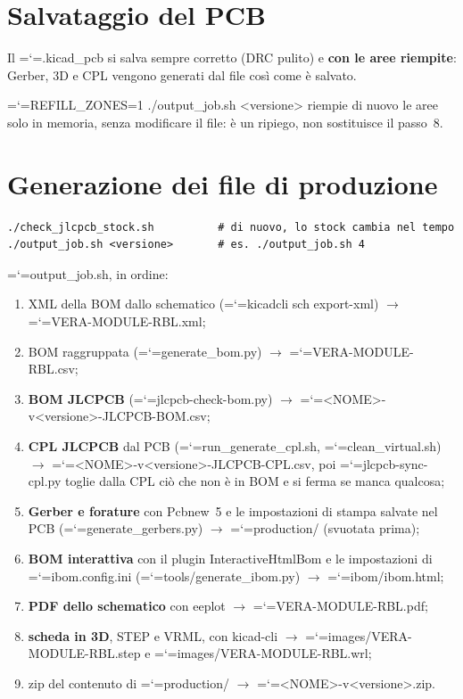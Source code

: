 \documentclass[11pt,a4paper]{article}
\makeatletter
\newcommand{\file}[1]{{\ttfamily\hyphenchar\font=`\-\relax\language=\l@nohyphenation #1}}
\makeatother
\begin{document}
\section{Salvataggio del PCB}

Il \file{.kicad\_pcb} si salva sempre corretto (DRC pulito) e \textbf{con le
aree riempite}: Gerber, 3D e CPL vengono generati dal file così come è salvato.

\file{REFILL\_ZONES=1 ./output\_job.sh <versione>} riempie di nuovo le aree solo
in memoria, senza modificare il file: è un ripiego, non sostituisce il passo~8.

\section{Generazione dei file di produzione}

\begin{lstlisting}[style=shell]
./check_jlcpcb_stock.sh          # di nuovo, lo stock cambia nel tempo
./output_job.sh <versione>       # es. ./output_job.sh 4
\end{lstlisting}

\file{output\_job.sh}, in ordine:

\begin{enumerate}[leftmargin=*]
  \item XML della BOM dallo schematico (\file{kicadcli sch export-xml})
        $\rightarrow$ \file{VERA-MODULE-RBL.xml};
  \item BOM raggruppata (\file{generate\_bom.py})
        $\rightarrow$ \file{VERA-MODULE-RBL.csv};
  \item \textbf{BOM JLCPCB} (\file{jlcpcb-check-bom.py})
        $\rightarrow$ \file{<NOME>-v<versione>-JLCPCB-BOM.csv};
  \item \textbf{CPL JLCPCB} dal PCB (\file{run\_generate\_cpl.sh},
        \file{clean\_virtual.sh}) $\rightarrow$
        \file{<NOME>-v<versione>-JLCPCB-CPL.csv}, poi
        \file{jlcpcb-sync-cpl.py} toglie dalla CPL ciò che non è in BOM e si
        ferma se manca qualcosa;
  \item \textbf{Gerber e forature} con Pcbnew~5 e le impostazioni di stampa
        salvate nel PCB (\file{generate\_gerbers.py}) $\rightarrow$
        \file{production/} (svuotata prima);
  \item \textbf{BOM interattiva} con il plugin InteractiveHtmlBom e le
        impostazioni di \file{ibom.config.ini} (\file{tools/generate\_ibom.py})
        $\rightarrow$ \file{ibom/ibom.html};
  \item \textbf{PDF dello schematico} con eeplot $\rightarrow$
        \file{VERA-MODULE-RBL.pdf};
  \item \textbf{scheda in 3D}, STEP e VRML, con kicad-cli $\rightarrow$
        \file{images/VERA-MODULE-RBL.step} e \file{images/VERA-MODULE-RBL.wrl};
  \item zip del contenuto di \file{production/} $\rightarrow$
        \file{<NOME>-v<versione>.zip}.
\end{enumerate}
\end{document}
